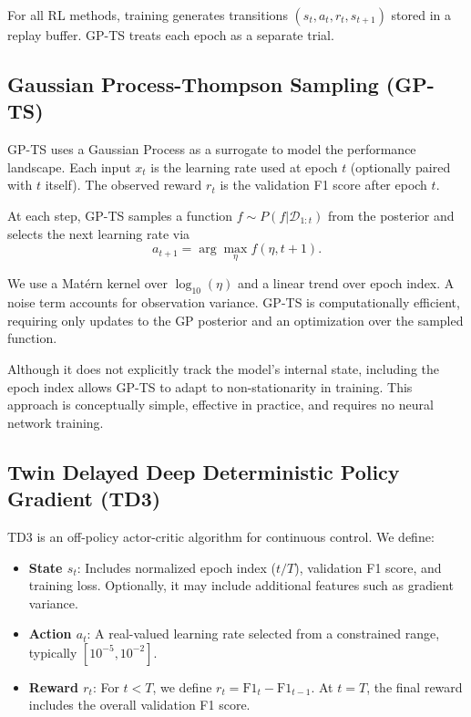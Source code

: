 \documentclass[11pt]{article}
\begin{document}
For all RL methods, training generates transitions $(s_t, a_t, r_t, s_{t+1})$ stored in a replay buffer. GP-TS treats each epoch as a separate trial.

\subsection{Gaussian Process-Thompson Sampling (GP-TS)}

GP-TS uses a Gaussian Process as a surrogate to model the performance landscape. Each input $x_t$ is the learning rate used at epoch $t$ (optionally paired with $t$ itself). The observed reward $r_t$ is the validation F1 score after epoch $t$.

At each step, GP-TS samples a function $f \sim P(f| \mathcal{D}_{1:t})$ from the posterior and selects the next learning rate via
\[
 a_{t+1} = \arg\max_{\eta} f(\eta, t+1).
\]

We use a Mat\'ern kernel over $\log_{10}(\eta)$ and a linear trend over epoch index. A noise term accounts for observation variance. GP-TS is computationally efficient, requiring only updates to the GP posterior and an optimization over the sampled function.

Although it does not explicitly track the model's internal state, including the epoch index allows GP-TS to adapt to non-stationarity in training. This approach is conceptually simple, effective in practice, and requires no neural network training.

\subsection{Twin Delayed Deep Deterministic Policy Gradient (TD3)}

TD3 is an off-policy actor-critic algorithm for continuous control. We define:

\begin{itemize}
  \item \textbf{State $s_t$}: Includes normalized epoch index ($t/T$), validation F1 score, and training loss. Optionally, it may include additional features such as gradient variance.
  \item \textbf{Action $a_t$}: A real-valued learning rate selected from a constrained range, typically $[10^{-5}, 10^{-2}]$.
  \item \textbf{Reward $r_t$}: For $t < T$, we define $r_t = \text{F1}_{t} - \text{F1}_{t-1}$. At $t = T$, the final reward includes the overall validation F1 score.
\end{itemize}
\end{document}
